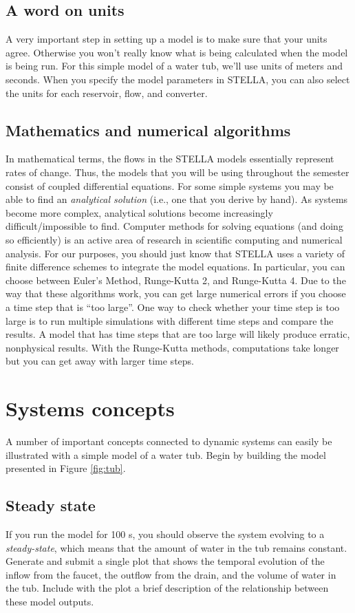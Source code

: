 \documentclass[11pt,letterpaper]{article}
\begin{document}
\subsection{A word on units}
A very important step in setting up a model is to make sure that your units agree. Otherwise you won't really know what is being calculated when the model is being run. For this simple model of a water tub, we'll use units of meters and seconds. When you specify the model parameters in STELLA, you can also select the units for each reservoir, flow, and converter.

\subsection{Mathematics and numerical algorithms}
In mathematical terms, the flows in the STELLA models essentially represent rates of change. Thus, the models that you will be using throughout the semester consist of coupled differential equations. For some simple systems you may be able to find an \textit{analytical solution} (i.e., one that you derive by hand). As systems become more complex, analytical solutions become increasingly difficult/impossible to find. Computer methods for solving equations (and doing so efficiently) is an active area of research in scientific computing and numerical analysis. For our purposes, you should just know that STELLA uses a variety of finite difference schemes to integrate the model equations. In particular, you can choose between Euler's Method, Runge-Kutta 2, and Runge-Kutta 4. Due to the way that these algorithms work, you can get large numerical errors if you choose a time step that is ``too large''. One way to check whether your time step is too large is to run multiple simulations with different time steps and compare the results. A model that has time steps that are too large will likely produce erratic, nonphysical results. With the Runge-Kutta methods, computations take longer but you can get away with larger time steps.


\section{Systems concepts}
A number of important concepts connected to dynamic systems can easily be illustrated with a simple model of a water tub. Begin by building the model presented in Figure \ref{fig:tub}.

\subsection{Steady state\label{sec:steady_state}}
If you run the model for 100 s, you should observe the system evolving to a \textit{steady-state}, which means that the amount of water in the tub remains constant. Generate and submit a single plot that shows the temporal evolution of the inflow from the faucet, the outflow from the drain, and the volume of water in the tub. Include with the plot a brief description of the relationship between these model outputs.
\end{document}
